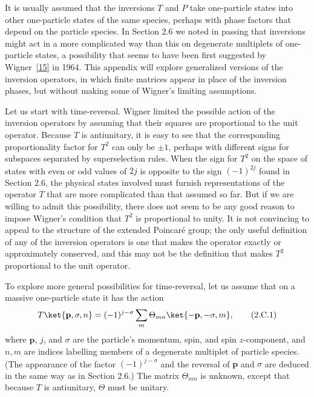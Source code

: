

It is usually assumed that the inversions $T$ and $P$ take one-particle states
into other one-particle states of the same species, perhaps with phase factors
that depend on the particle species. In Section 2.6 we noted in passing that
inversions might act in a more complicated way than this on degenerate
multiplets of one-particle states, a possibility that seems to have been first
suggested by Wigner~\hyperref[ref:2.15]{[15]} in 1964. This appendix will explore
generalized versions of the inversion operators, in which finite matrices
appear in place of the inversion phases, but without making some of Wigner's
limiting assumptions.

Let us start with time-reversal. Wigner limited the possible action of the
inversion operators by assuming that their squares are proportional to the
unit operator. Because $T$ is antiunitary, it is easy to see that the
corresponding proportionality factor for $T^2$ can only be $\pm1$, perhaps
with different signs for subspaces separated by superselection rules. When
the sign for $T^2$ on the space of states with even or odd values of $2j$ is
opposite to the sign $(-1)^{2j}$ found in Section 2.6, the physical states
involved must furnish representations of the operator $T$ that are more
complicated than that assumed so far. But if we are willing to admit this
possibility, there does not seem to be any good reason to impose Wigner's
condition that $T^2$ is proportional to unity. It is not convincing to appeal
to the structure of the extended Poincar\'e group; the only useful definition
of any of the inversion operators is one that makes the operator exactly or
approximately conserved, and this may not be the definition that makes $T^2$
proportional to the unit operator.

To explore more general possibilities for time-reversal, let us assume that
on a massive one-particle state it has the action
\begin{equation}
  T\ket{\mathbf{p},\sigma,n}
    =(-1)^{j-\sigma}\sum_m \Theta_{mn}
      \ket{-\mathbf{p},-\sigma,m},
  \tag{2.C.1}\label{eq:2.C.1}
\end{equation}
where $\mathbf{p}$, $j$, and $\sigma$ are the particle's momentum, spin, and
spin $z$-component, and $n,m$ are indices labelling members of a degenerate
multiplet of particle species. (The appearance of the factor
$(-1)^{j-\sigma}$ and the reversal of $\mathbf{p}$ and $\sigma$ are deduced in
the same way as in Section 2.6.) The matrix $\Theta_{mn}$ is unknown,
except that because $T$ is antiunitary, $\Theta$ must be unitary.

